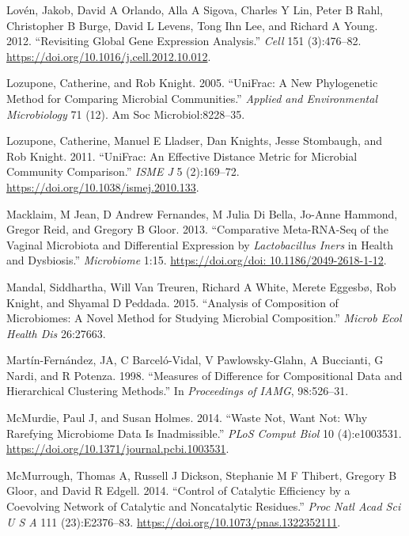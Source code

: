 \documentclass[onecolumn]{book}
\theoremstyle{definition}
\theoremstyle{definition}
\theoremstyle{definition}
\theoremstyle{remark}
\begin{document}
\leavevmode\hypertarget{ref-Loven:2012aa}{}%
Lovén, Jakob, David A Orlando, Alla A Sigova, Charles Y Lin, Peter B
Rahl, Christopher B Burge, David L Levens, Tong Ihn Lee, and Richard A
Young. 2012. ``Revisiting Global Gene Expression Analysis.'' \emph{Cell}
151 (3):476--82. \url{https://doi.org/10.1016/j.cell.2012.10.012}.

\leavevmode\hypertarget{ref-unifrac:2005}{}%
Lozupone, Catherine, and Rob Knight. 2005. ``UniFrac: A New Phylogenetic
Method for Comparing Microbial Communities.'' \emph{Applied and
Environmental Microbiology} 71 (12). Am Soc Microbiol:8228--35.

\leavevmode\hypertarget{ref-Lozupone:2011aa}{}%
Lozupone, Catherine, Manuel E Lladser, Dan Knights, Jesse Stombaugh, and
Rob Knight. 2011. ``UniFrac: An Effective Distance Metric for Microbial
Community Comparison.'' \emph{ISME J} 5 (2):169--72.
\url{https://doi.org/10.1038/ismej.2010.133}.

\leavevmode\hypertarget{ref-macklaim:2013}{}%
Macklaim, M Jean, D Andrew Fernandes, M Julia Di Bella, Jo-Anne Hammond,
Gregor Reid, and Gregory B Gloor. 2013. ``Comparative Meta-RNA-Seq of
the Vaginal Microbiota and Differential Expression by
\emph{Lactobacillus Iners} in Health and Dysbiosis.'' \emph{Microbiome}
1:15.
\href{https://doi.org/doi:\%2010.1186/2049-2618-1-12}{https://doi.org/doi: 10.1186/2049-2618-1-12}.

\leavevmode\hypertarget{ref-ancom:2015}{}%
Mandal, Siddhartha, Will Van Treuren, Richard A White, Merete Eggesbø,
Rob Knight, and Shyamal D Peddada. 2015. ``Analysis of Composition of
Microbiomes: A Novel Method for Studying Microbial Composition.''
\emph{Microb Ecol Health Dis} 26:27663.

\leavevmode\hypertarget{ref-martin1998measures}{}%
Martín-Fernández, JA, C Barceló-Vidal, V Pawlowsky-Glahn, A Buccianti, G
Nardi, and R Potenza. 1998. ``Measures of Difference for Compositional
Data and Hierarchical Clustering Methods.'' In \emph{Proceedings of
IAMG}, 98:526--31.

\leavevmode\hypertarget{ref-McMurdie:2014a}{}%
McMurdie, Paul J, and Susan Holmes. 2014. ``Waste Not, Want Not: Why
Rarefying Microbiome Data Is Inadmissible.'' \emph{PLoS Comput Biol} 10
(4):e1003531. \url{https://doi.org/10.1371/journal.pcbi.1003531}.

\leavevmode\hypertarget{ref-mcmurrough:2014}{}%
McMurrough, Thomas A, Russell J Dickson, Stephanie M F Thibert, Gregory
B Gloor, and David R Edgell. 2014. ``Control of Catalytic Efficiency by
a Coevolving Network of Catalytic and Noncatalytic Residues.''
\emph{Proc Natl Acad Sci U S A} 111 (23):E2376--83.
\url{https://doi.org/10.1073/pnas.1322352111}.
\end{document}
